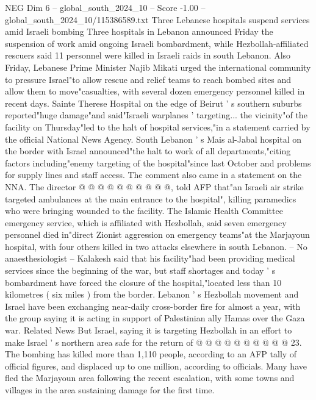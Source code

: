 \begin{textsample}{NEG Dim 6 – global\_south\_2024\_10 – Score -1.00 – global\_south\_2024\_10/115386589.txt}  \label{ex:f6_neg_056}
Three Lebanese hospitals suspend services amid Israeli bombing Three hospitals in Lebanon announced Friday the suspension of work amid ongoing Israeli bombardment, while Hezbollah-affiliated rescuers said 11 personnel were killed in Israeli raids in south Lebanon.
Also Friday, Lebanese Prime Minister Najib Mikati urged the international community to pressure Israel"to allow rescue and relief teams to reach bombed sites and allow them to move"casualties, with several dozen emergency personnel killed in recent days.
Sainte Therese Hospital on the edge of Beirut ' s southern suburbs reported"huge damage"and said"Israeli warplanes ' targeting... the vicinity"of the facility on Thursday"led to the halt of hospital services,"in a statement carried by the official National News Agency.
South Lebanon ' s Mais al-Jabal hospital on the border with Israel announced"the halt to work of all departments,"citing factors including"enemy targeting of the hospital"since last October and problems for supply lines and staff access.
The comment also came in a statement on the NNA.
The director @ @ @ @ @ @ @ @ @ @, told AFP that"an Israeli air strike targeted ambulances at the main entrance to the hospital", killing paramedics who were bringing wounded to the facility.
The Islamic Health Committee emergency service, which is affiliated with Hezbollah, said seven emergency personnel died in"direct Zionist aggression on emergency teams"at the Marjayoun hospital, with four others killed in two attacks elsewhere in south Lebanon. -- No anaesthesiologist -- Kalakesh said that his facility"had been providing medical services since the beginning of the war, but staff shortages and today ' s bombardment have forced the closure of the hospital,"located less than 10 kilometres ( six miles ) from the border.
Lebanon ' s Hezbollah movement and Israel have been exchanging near-daily cross-border fire for almost a year, with the group saying it is acting in support of Palestinian ally Hamas over the Gaza war.
Related News But Israel, saying it is targeting Hezbollah in an effort to make Israel ' s northern area safe for the return of @ @ @ @ @ @ @ @ @ @ 23.
The bombing has killed more than 1,110 people, according to an AFP tally of official figures, and displaced up to one million, according to officials.
Many have fled the Marjayoun area following the recent escalation, with some towns and villages in the area sustaining damage for the first time.

\end{textsample}
